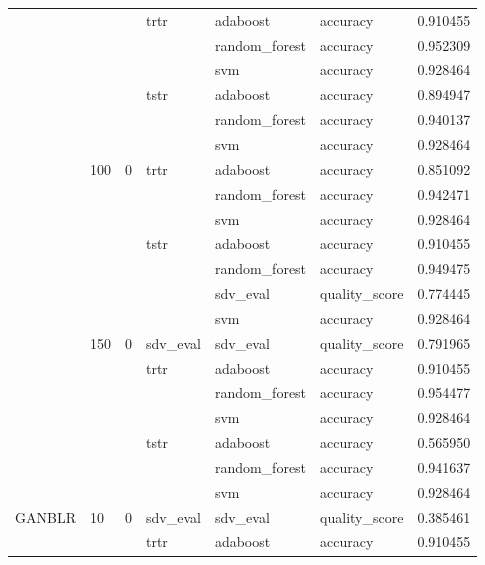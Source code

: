 \begin{longtable}{llllllr}
 &  &  & \multirow[t]{3}{*}{trtr} & adaboost & accuracy & 0.910455 \\
\cline{5-7}
 &  &  &  & random_forest & accuracy & 0.952309 \\
\cline{5-7}
 &  &  &  & svm & accuracy & 0.928464 \\
\cline{4-7} \cline{5-7}
 &  &  & \multirow[t]{3}{*}{tstr} & adaboost & accuracy & 0.894947 \\
\cline{5-7}
 &  &  &  & random_forest & accuracy & 0.940137 \\
\cline{5-7}
 &  &  &  & svm & accuracy & 0.928464 \\
\cline{2-7} \cline{3-7} \cline{4-7} \cline{5-7}
 & \multirow[t]{7}{*}{100} & \multirow[t]{7}{*}{0} & \multirow[t]{3}{*}{trtr} & adaboost & accuracy & 0.851092 \\
\cline{5-7}
 &  &  &  & random_forest & accuracy & 0.942471 \\
\cline{5-7}
 &  &  &  & svm & accuracy & 0.928464 \\
\cline{4-7} \cline{5-7}
 &  &  & \multirow[t]{4}{*}{tstr} & adaboost & accuracy & 0.910455 \\
\cline{5-7}
 &  &  &  & random_forest & accuracy & 0.949475 \\
\cline{5-7}
 &  &  &  & sdv_eval & quality_score & 0.774445 \\
\cline{5-7}
 &  &  &  & svm & accuracy & 0.928464 \\
\cline{2-7} \cline{3-7} \cline{4-7} \cline{5-7}
 & \multirow[t]{7}{*}{150} & \multirow[t]{7}{*}{0} & sdv_eval & sdv_eval & quality_score & 0.791965 \\
\cline{4-7} \cline{5-7}
 &  &  & \multirow[t]{3}{*}{trtr} & adaboost & accuracy & 0.910455 \\
\cline{5-7}
 &  &  &  & random_forest & accuracy & 0.954477 \\
\cline{5-7}
 &  &  &  & svm & accuracy & 0.928464 \\
\cline{4-7} \cline{5-7}
 &  &  & \multirow[t]{3}{*}{tstr} & adaboost & accuracy & 0.565950 \\
\cline{5-7}
 &  &  &  & random_forest & accuracy & 0.941637 \\
\cline{5-7}
 &  &  &  & svm & accuracy & 0.928464 \\
\cline{1-7} \cline{2-7} \cline{3-7} \cline{4-7} \cline{5-7}
\multirow[t]{70}{*}{GANBLR} & \multirow[t]{14}{*}{10} & \multirow[t]{7}{*}{0} & sdv_eval & sdv_eval & quality_score & 0.385461 \\
\cline{4-7} \cline{5-7}
 &  &  & \multirow[t]{3}{*}{trtr} & adaboost & accuracy & 0.910455 \\

\end{longtable}
